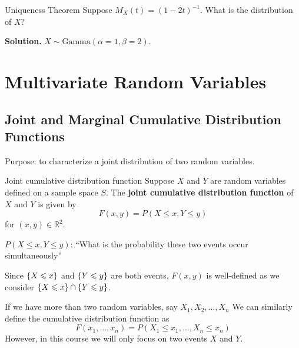 \begin{Example}{Uniqueness Theorem}{}
    Suppose $ M_X(t)=(1-2t)^{-1} $. What is the
    distribution of $ X $?

    \textbf{Solution.} $ X \sim \text{Gamma}(\alpha=1,\beta=2) $.
\end{Example}

\chapter{Multivariate Random Variables}
\section{Joint and Marginal Cumulative Distribution Functions}
Purpose: to characterize a joint distribution
of two random variables.
\begin{Definition}{Joint cumulative distribution function}{}
    Suppose $ X $ and $ Y $ are random variables defined on
    a sample space $ S $. The \textbf{joint cumulative
        distribution function} of $ X $ and $ Y $ is given by
    \[ F(x,y)=P(X\leqslant x,Y\leqslant y) \]
    for $ (x,y)\in\mathbb{R}^2 $.
\end{Definition}
$ P(X\leqslant x,Y\leqslant y) $:
``What is the probability these two events occur simultaneously''
\begin{Remark}{}{}
    Since $ \{X\leqslant x\} $ and $ \{Y\leqslant y\} $
    are both events, $ F(x,y) $ is well-defined as
    we consider $ \{X\leqslant x\}\cap \{Y\leqslant y\} $.
\end{Remark}
\begin{Remark}{}{}
    If we have more than two random variables, say $ X_1,X_2,\ldots,X_n $
    We can similarly define the cumulative distribution function as
    \[ F(x_1,\ldots,x_n)=P(X_1\leqslant x_1,\ldots,X_n\leqslant x_n) \]
    However, in this course we will only focus on two events $ X $ and $ Y $.
\end{Remark}

